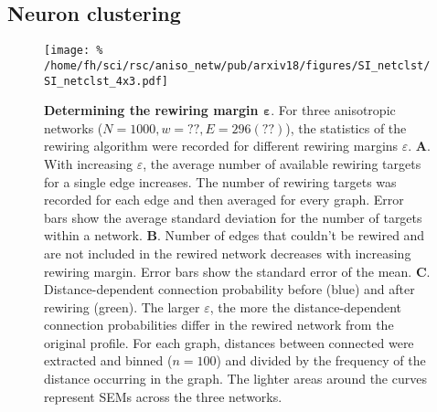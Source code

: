 \subsection{Neuron clustering}

\addtocounter{subsection}{1}
\begin{figure}[h!]
  \texttt{[image: \%
    /home/fh/sci/rsc/aniso\_netw/pub/arxiv18/figures/SI\_netclst/SI\_netclst\_4x3.pdf]}
  \caption{\textbf{Determining the rewiring margin $\bm{\varepsilon}$}. For three anisotropic networks ($N=1000, w=??, E= 296 (??)$), the statistics of the rewiring algorithm were recorded for different rewiring margins $\varepsilon$.
    \textbf{A}. With increasing $\varepsilon$, the average number of available rewiring targets for a single edge increases. The number of rewiring targets was recorded for each edge and then averaged for every graph. Error bars show the average standard deviation for the number of targets within a network.
    \textbf{B}. Number of edges that couldn't be rewired and are not included in the rewired network decreases with increasing rewiring margin. Error bars show the standard error of the mean. \textbf{C}. Distance-dependent connection probability before (blue) and after rewiring (green). The larger $\varepsilon$, the more the distance-dependent connection probabilities differ in the rewired network from the original profile. For each graph, distances between connected were extracted and binned ($n=100$) and divided by the frequency of the distance occurring in the graph. The lighter areas around the curves represent SEMs across the three networks.}
  \label{fig:nclst}
\end{figure}
